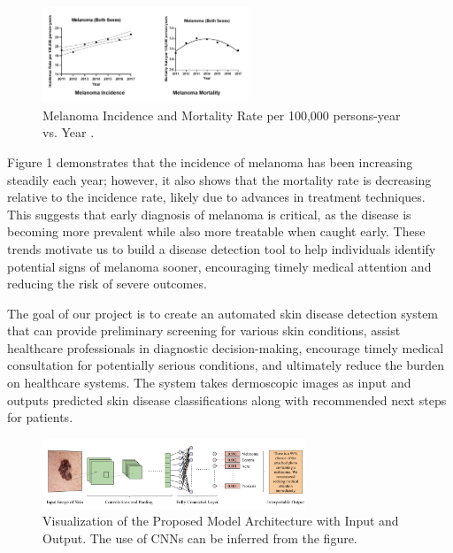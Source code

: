 \documentclass{article} %
\begin{document}
\begin{figure}[h]
\begin{center}
\includegraphics[width=0.55\textwidth]{Figs/melanoma_incidence_mortality.png}
\end{center}
\caption{Melanoma Incidence and Mortality Rate per 100,000 persons-year vs. Year \citep{mcgill_melanoma}.}
\end{figure}

Figure 1 demonstrates that the incidence of melanoma has been increasing steadily each year; however, it also shows that the mortality rate is decreasing relative to the incidence rate, likely due to advances in treatment techniques. This suggests that early diagnosis of melanoma is critical, as the disease is becoming more prevalent while also more treatable when caught early. These trends motivate us to build a disease detection tool to help individuals identify potential signs of melanoma sooner, encouraging timely medical attention and reducing the risk of severe outcomes.

The goal of our project is to create an automated skin disease detection system that can provide preliminary screening for various skin conditions, assist healthcare professionals in diagnostic decision-making, encourage timely medical consultation for potentially serious conditions, and ultimately reduce the burden on healthcare systems. The system takes dermoscopic images as input and outputs predicted skin disease classifications along with recommended next steps for patients.

\begin{figure}[h]
\begin{center}
\includegraphics[width=0.7\textwidth]{Figs/system_visualization.png}
\end{center}
\caption{Visualization of the Proposed Model Architecture with Input and Output. The use of CNNs can be inferred from the figure.}
\end{figure}
\end{document}
